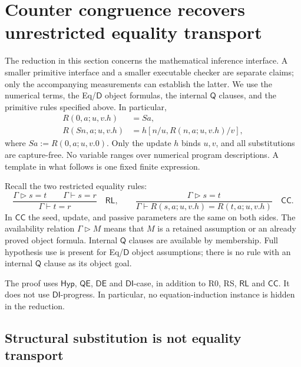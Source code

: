 
\section{Counter congruence recovers unrestricted equality transport}
\label{ctr:section}

The reduction in this section concerns the mathematical inference
interface. A smaller primitive interface and a smaller executable checker
are separate claims; only the accompanying measurements can establish
the latter. We use the numerical terms, the Eq/$\mathsf D$ object
formulas, the internal $\mathsf Q$ clauses, and the primitive rules
specified above. In particular,
\[
 \begin{aligned}
 R(0,a;u,v.h)&=Sa,\\
 R(Sn,a;u,v.h)&=h[n/u,R(n,a;u,v.h)/v],
 \end{aligned}
 \tag{R0, RS}
\]
where $Sa:=R(0,a;u,v.0)$.
Only the update $h$ binds $u,v$, and all substitutions are capture-free.
No variable ranges over numerical program descriptions. A template in
what follows is one fixed finite expression.

Recall the two restricted equality rules:
\[
 \frac{\Gamma\mathrel{\triangleright}s=t\qquad
       \Gamma\vdash s=r}
      {\Gamma\vdash t=r}
 \quad\mathsf{RL},
 \qquad
 \frac{\Gamma\mathrel{\triangleright}s=t}
      {\Gamma\vdash R(s,a;u,v.h)=R(t,a;u,v.h)}
 \quad\mathsf{CC}.
 \tag{Root and counter}
\]
In $\mathsf{CC}$ the seed, update, and passive parameters are the same
on both sides. The availability relation $\Gamma\mathrel{\triangleright}M$
means that $M$ is a retained assumption or an already proved object
formula. Internal $\mathsf Q$ clauses are available by membership.
Full hypothesis use is present for Eq/$\mathsf D$ object assumptions;
there is no rule with an internal $\mathsf Q$ clause as its object goal.

The proof uses $\mathsf{Hyp}$, $\mathsf{QE}$, $\mathsf{DE}$ and
$\mathsf{DI}$-case, in addition to R0, RS, $\mathsf{RL}$ and
$\mathsf{CC}$. It does not use $\mathsf{DI}$-progress. In particular,
no equation-induction instance is hidden in the reduction.

\subsection{Structural substitution is not equality transport}

